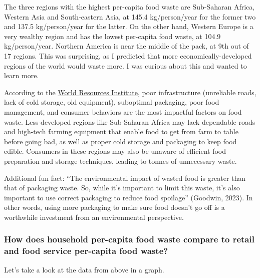 \documentclass[
]{article}
\begin{document}
The three regions with the highest per-capita food waste are Sub-Saharan
Africa, Western Asia and South-eastern Asia, at 145.4 kg/person/year for
the former two and 137.5 kg/person/year for the latter. On the other
hand, Western Europe is a very wealthy region and has the lowest
per-capita food waste, at 104.9 kg/person/year. Northern America is near
the middle of the pack, at 9th out of 17 regions. This was surprising,
as I predicted that more economically-developed regions of the world
would waste more. I was curious about this and wanted to learn more.

According to the
\href{https://www.wri.org/insights/reducing-food-loss-and-food-waste\#:~:text=There\%20used\%20to\%20be\%20a,shown\%20this\%20isn\%27t\%20true.}{World
Resources Institute}, poor infrastructure (unreliable roads, lack of
cold storage, old equipment), suboptimal packaging, poor food
management, and consumer behaviors are the most impactful factors on
food waste. Less-developed regions like Sub-Saharan Africa may lack
dependable roads and high-tech farming equipment that enable food to get
from farm to table before going bad, as well as proper cold storage and
packaging to keep food edible. Consumers in these regions may also be
unaware of efficient food preparation and storage techniques, leading to
tonnes of unnecessary waste.

Additional fun fact: ``The environmental impact of wasted food is
greater than that of packaging waste. So, while it's important to limit
this waste, it's also important to use correct packaging to reduce food
spoilage'' (Goodwin, 2023). In other words, using more packaging to make
sure food doesn't go off is a worthwhile investment from an
environmental perspective.

\hypertarget{how-does-household-per-capita-food-waste-compare-to-retail-and-food-service-per-capita-food-waste}{%
\subsubsection{How does household per-capita food waste compare to
retail and food service per-capita food
waste?}\label{how-does-household-per-capita-food-waste-compare-to-retail-and-food-service-per-capita-food-waste}}

Let's take a look at the data from above in a graph.
\end{document}
